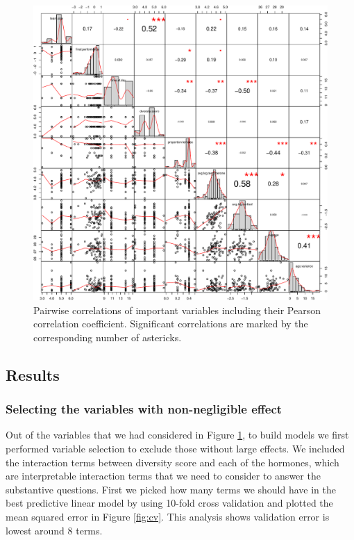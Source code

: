 \documentclass[]{article}
\begin{document}
\begin{figure}
\centering
\includegraphics{19_10_27_hw7_q1_files/figure-latex/dists-1.pdf}
\caption{\label{fig:pairs}Pairwise correlations of important variables
including their Pearson correlation coefficient. Significant
correlations are marked by the corresponding number of astericks.}
\end{figure}

\subsection{Results}\label{results}

\subsubsection{Selecting the variables with non-negligible
effect}\label{selecting-the-variables-with-non-negligible-effect}

Out of the variables that we had considered in Figure \ref{fig:pairs},
to build models we first performed variable selection to exclude those
without large effects. We included the interaction terms between
diversity score and each of the hormones, which are interpretable
interaction terms that we need to consider to answer the substantive
questions. First we picked how many terms we should have in the best
predictive linear model by using 10-fold cross validation and plotted
the mean squared error in Figure \ref{fig:cv}. This analysis shows
validation error is lowest around 8 terms.
\end{document}
